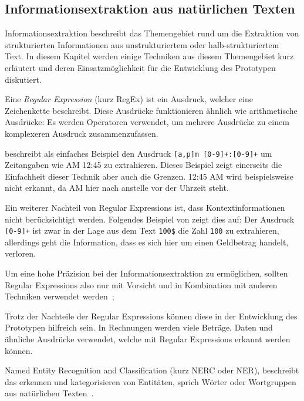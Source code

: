 \subsection{Informationsextraktion aus natürlichen Texten}
\label{chap:ner}


Informationsextraktion beschreibt das Themengebiet rund um die Extraktion von strukturierten Informationen aus unstrukturiertem oder halb-strukturiertem Text. In diesem Kapitel werden einige Techniken aus diesem Themengebiet kurz erläutert und deren Ein\-satz\-mög\-lich\-keit für die Entwicklung des Prototypen diskutiert.

Eine \textit{Regular Expression} (kurz RegEx) ist ein Ausdruck, welcher eine Zeichenkette beschreibt. Diese Ausdrücke funktionieren ähnlich wie arithmetische Ausdrücke: Es werden Operatoren verwendet, um mehrere Ausdrücke zu einem komplexeren Ausdruck zusammenzufassen\autocite{Xiao2004}.

\textcite{Xiao2004} beschreibt als einfaches Beispiel den Ausdruck \texttt{[a,p]m [0-9]+:[0-9]+} um Zeitangaben wie AM 12:45 zu extrahieren. Dieses Beispiel zeigt einerseits die Einfachheit dieser Technik aber auch die Grenzen. 12:45 AM wird beispielsweise nicht erkannt, da AM hier nach anstelle vor der Uhrzeit steht. 

Ein weiterer Nachteil von Regular Expressions ist, dass Kontextinformationen nicht be\-rück\-sich\-tigt werden. Folgendes Beispiel von \textcite{Xiao2004} zeigt dies auf: Der Ausdruck \texttt{[0-9]+} ist zwar in der Lage aus dem Text \texttt{100\$} die Zahl \texttt{100} zu extrahieren, allerdings geht die Information, dass es sich hier um einen Geldbetrag handelt, verloren.

Um eine hohe Präzision bei der Informationsextraktion zu ermöglichen, sollten Regular Expressions also nur mit Vorsicht und in Kombination mit anderen Techniken verwendet werden~\autocite{Xiao2004};

Trotz der Nachteile der Regular Expressions können diese in der Entwicklung des Prototypen hilfreich sein. In Rechnungen werden viele Beträge, Daten und ähnliche Ausdrücke verwendet, welche mit Regular Expressions erkannt werden können.

Named Entity Recognition and Classification (kurz NERC oder NER), beschreibt das erkennen und kategorisieren von Entitäten, sprich Wörter oder Wortgruppen aus natürlichen Texten~\autocite{Nadeau2007}.


